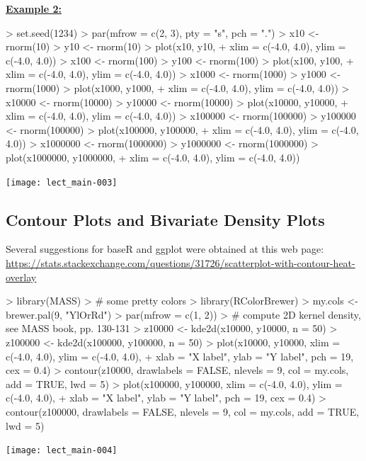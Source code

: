 \documentclass[12pt,letterpaper,final]{article}
\begin{document}
\underline{\bf Example 2:}
%
\begin{Schunk}
\begin{Sinput}
> set.seed(1234) 
> par(mfrow = c(2, 3), pty = "s", pch = ".")
> x10 <- rnorm(10)
> y10 <- rnorm(10)
> plot(x10, y10,
+   xlim = c(-4.0, 4.0), ylim = c(-4.0, 4.0))
> x100 <- rnorm(100)
> y100 <- rnorm(100)
> plot(x100, y100,
+   xlim = c(-4.0, 4.0), ylim = c(-4.0, 4.0))
> x1000 <- rnorm(1000)
> y1000 <- rnorm(1000)
> plot(x1000, y1000,
+   xlim = c(-4.0, 4.0), ylim = c(-4.0, 4.0))
> x10000 <- rnorm(10000)
> y10000 <- rnorm(10000)
> plot(x10000, y10000,
+   xlim = c(-4.0, 4.0), ylim = c(-4.0, 4.0))
> x100000 <- rnorm(100000)
> y100000 <- rnorm(100000)
> plot(x100000, y100000,
+   xlim = c(-4.0, 4.0), ylim = c(-4.0, 4.0))
> x1000000 <- rnorm(1000000)
> y1000000 <- rnorm(1000000)
> plot(x1000000, y1000000,
+   xlim = c(-4.0, 4.0), ylim = c(-4.0, 4.0))
\end{Sinput}
\end{Schunk}
\texttt{[image: lect\_main-003]}


\newpage


\subsection{Contour Plots and Bivariate Density Plots}


Several suggestions for baseR and ggplot were obtained at this web page:
\url{https://stats.stackexchange.com/questions/31726/scatterplot-with-contour-heat-overlay}

\begin{Schunk}
\begin{Sinput}
> library(MASS)
> # some pretty colors
> library(RColorBrewer)
> my.cols <- brewer.pal(9, "YlOrRd")
> par(mfrow = c(1, 2))
> # compute 2D kernel density, see MASS book, pp. 130-131
> z10000 <- kde2d(x10000, y10000, n = 50)
> z100000 <- kde2d(x100000, y100000, n = 50)
> plot(x10000, y10000, xlim = c(-4.0, 4.0), ylim = c(-4.0, 4.0),
+      xlab = "X label", ylab = "Y label", pch = 19, cex = 0.4)
> contour(z10000, drawlabels = FALSE, nlevels = 9, col = my.cols, add = TRUE, lwd = 5)
> plot(x100000, y100000, xlim = c(-4.0, 4.0), ylim = c(-4.0, 4.0),
+      xlab = "X label", ylab = "Y label", pch = 19, cex = 0.4)
> contour(z100000, drawlabels = FALSE, nlevels = 9, col = my.cols, add = TRUE, lwd = 5)
\end{Sinput}
\end{Schunk}
\texttt{[image: lect\_main-004]}
\end{document}
